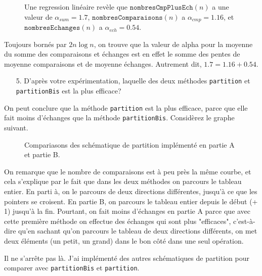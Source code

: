 \documentclass[10pt]{article} %
\begin{document}
\begin{figure}[h!]
   \centering
   
   \vspace{-1cm}
   \caption{Une regression linéaire revèle que $\texttt{nombresCmpPlusEch}(n)$ a une valeur de $\alpha_{sum} = 1.7$,  $\texttt{nombresComparaisons}(n)$ a $\alpha_{cmp} = 1.16$,
   et $\texttt{nombresEchanges}(n)$ a $\alpha_{ech} = 0.54$.}
\end{figure}

Toujours bornés par $2 n \log n$, on trouve que la valeur de alpha pour la moyenne du somme des comparaisons et échanges est en effet
le somme des pentes de moyenne comparaisons et de moyenne échanges. Autrement dit, $1.7 = 1.16 + 0.54$.

\begin{itemize}
    \item[5.] D'après votre expérimentation, laquelle des deux méthodes \texttt{partition} et \texttt{partitionBis} est la
    plus efficace?
\end{itemize}

On peut conclure que la méthode \texttt{partition} est la plus efficace, parce que elle fait moins d'échanges que la méthode
\texttt{partitionBis}. Considèrez le graphe suivant.


\begin{figure}[h!]
    \centering
    
    \vspace{-1cm}
    \caption{Compariasons des schématique de partition implémenté en partie A et partie B.}
\end{figure}

On remarque que le nombre de comparaisons est à peu près la même courbe, et cela s'explique par le fait que dans les deux méthodes on parcours le tableau
entier. En parti à, on le parcours de deux directions différentes, jusqu'à ce que les pointers se croisent. En partie B, on parcours le tableau entier depuis le
début (+ 1) jusqu'à la fin. Pourtant, on fait moins d'échanges en partie A parce que avec cette première méthode on effectue des échanges qui sont plus "efficaces", c'est-à-dire
qu'en sachant qu'on parcours le tableau de deux directions différents, on met deux éléments (un petit, un grand) dans le bon côté dans une seul opération.

Il ne s'arrête pas là. J'ai implémenté des autres schématiques de partition pour comparer avec \texttt{partitionBis} et \texttt{partition}.
\newpage
\end{document}
